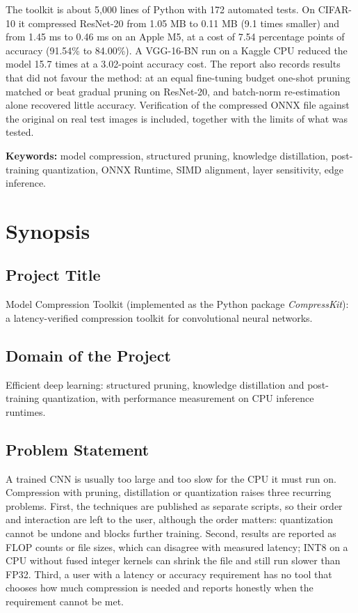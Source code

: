 \documentclass[oneside,a4paper,12pt]{report}
\begin{document}
The toolkit is about 5,000 lines of Python with 172 automated tests. On CIFAR-10 it compressed ResNet-20 from 1.05 MB to 0.11 MB (9.1 times smaller) and from 1.45 ms to 0.46 ms on an Apple M5, at a cost of 7.54 percentage points of accuracy (91.54\% to 84.00\%). A VGG-16-BN run on a Kaggle CPU reduced the model 15.7 times at a 3.02-point accuracy cost. The report also records results that did not favour the method: at an equal fine-tuning budget one-shot pruning matched or beat gradual pruning on ResNet-20, and batch-norm re-estimation alone recovered little accuracy. Verification of the compressed ONNX file against the original on real test images is included, together with the limits of what was tested.

\vspace{0.4cm}
\textbf{Keywords:} model compression, structured pruning, knowledge distillation, post-training quantization, ONNX Runtime, SIMD alignment, layer sensitivity, edge inference.
\newpage

\tableofcontents
\listoffigures
\listoftables
\newpage


\chapter{Synopsis}
\section{Project Title}
Model Compression Toolkit (implemented as the Python package \emph{CompressKit}): a latency-verified compression toolkit for convolutional neural networks.

\section{Domain of the Project}
Efficient deep learning: structured pruning, knowledge distillation and post-training quantization, with performance measurement on CPU inference runtimes.

\section{Problem Statement}
A trained CNN is usually too large and too slow for the CPU it must run on. Compression with pruning, distillation or quantization raises three recurring problems. First, the techniques are published as separate scripts, so their order and interaction are left to the user, although the order matters: quantization cannot be undone and blocks further training. Second, results are reported as FLOP counts or file sizes, which can disagree with measured latency; INT8 on a CPU without fused integer kernels can shrink the file and still run slower than FP32. Third, a user with a latency or accuracy requirement has no tool that chooses how much compression is needed and reports honestly when the requirement cannot be met.
\end{document}
